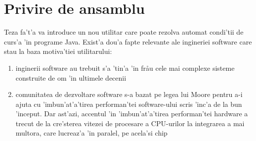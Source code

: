 \graphicspath{{content/summary/figures/}}

\section{Privire de ansamblu}

Teza fa't'a va introduce un nou utilitar care poate rezolva automat
condi'tii de curs'a 'in programe Java. Exist'a dou'a fapte relevante
ale ingineriei software care stau la baza motiva'tiei utilitarului:

\begin{enumerate}
  \item inginerii software au trebuit s'a 'tin'a 'in fr\aa u cele mai
  complexe sisteme construite de om 'in ultimele decenii
  
  \item comunitatea de dezvoltare software s-a bazat pe legea lui Moore pentru
  a-i ajuta cu 'imbun'at'a'tirea performan'tei software-ului scris 'inc'a
  de la bun 'inceput. Dar ast'azi, accentul 'in 'imbun'at'a'tirea
  performan'tei hardware a trecut de la cre'sterea vitezei de procesare a
  CPU-urilor la integrarea a mai multora, care lucreaz'a 'in paralel, pe
  acela'si chip
\end{enumerate}

